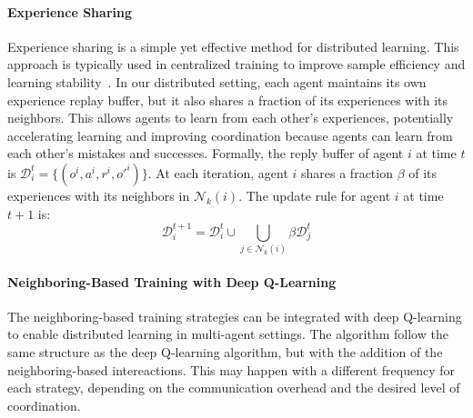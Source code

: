 \documentclass[sigconf]{acmart}
\begin{document}
\paragraph{Experience Sharing}
Experience sharing is a simple yet effective method for distributed learning.
This approach is typically used in centralized training to improve sample efficiency and learning stability~\cite{marl-book}.
In our distributed setting, each agent maintains its own experience replay buffer, 
but it also shares a fraction of its experiences with its neighbors.
This allows agents to learn from each other's experiences, 
potentially accelerating learning and improving coordination because agents can learn from each other's mistakes and successes.
%
Formally, the reply buffer of agent $i$ at time $t$ is $\mathcal{D}^t_i = \{(o^i, a^i, r^i, o'^i)\}$.
At each iteration, agent $i$ shares a fraction $\beta$ of its experiences with its neighbors in $\mathcal{N}_k(i)$.
The update rule for agent $i$ at time $t+1$ is:
\begin{equation}
  \mathcal{D}^{t+1}_i = \mathcal{D}^t_i \cup \bigcup_{j \in \mathcal{N}_k(i)} \beta \mathcal{D}^t_j
\end{equation}
\paragraph{Neighboring-Based Training with Deep Q-Learning}
The neighboring-based training strategies can be integrated with deep Q-learning to enable distributed learning in multi-agent settings.
%
The algorithm follow the same structure as the deep Q-learning algorithm, 
but with the addition of the neighboring-based intereactions.
%
This may happen with a different frequency for each strategy, 
depending on the communication overhead and the desired level of coordination.
\end{document}
